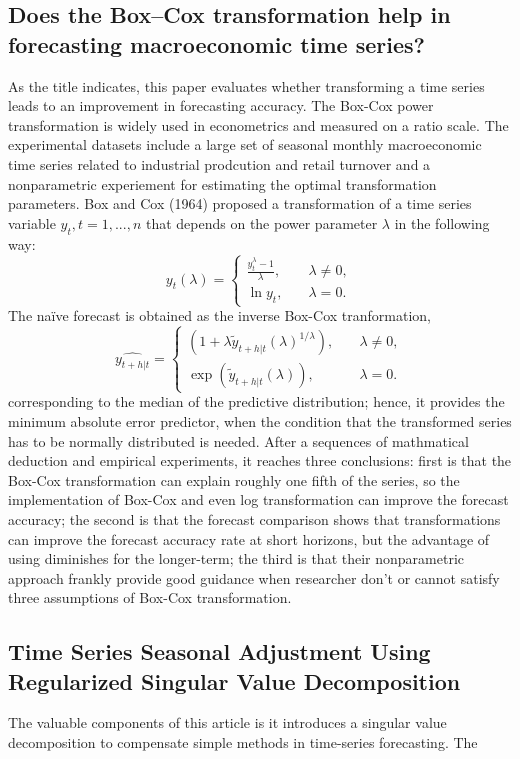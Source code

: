 \documentclass[12pt]{article}
\begin{document}
\subsection{Does the Box–Cox transformation help in forecasting macroeconomic time series? }
As the title indicates, this paper evaluates whether transforming a time series leads to an improvement in forecasting accuracy. The Box-Cox power transformation is widely used in econometrics and measured on a ratio scale. The experimental datasets include a large set of seasonal monthly macroeconomic time series related to industrial prodcution and retail turnover and a nonparametric experiement for estimating the optimal transformation parameters. Box and Cox (1964) proposed a transformation of a time series variable $y_t, t = 1, ..., n$ that depends on the power parameter $\lambda$ in the following way: 
$$
y_t(\lambda) = 
  \begin{cases}
    \frac{y_t^{\lambda} - 1}{\lambda}, &\quad \lambda \neq 0, \\ 
    \ln{y_t}, &\quad \lambda = 0. 
  \end{cases}
$$
The naïve forecast is obtained as the inverse Box-Cox tranformation, 
$$
\hat{y_{t+h|t}} = 
  \begin{cases}
    (1+\lambda \tilde{y}_{t+h|t}(\lambda)^{1/\lambda}), &\quad \lambda \neq 0, \\
    \exp(\tilde{y}_{t+h|t}(\lambda)), &\quad \lambda = 0. 
  \end{cases} 
$$
corresponding to the median of the predictive distribution; hence, it provides the minimum absolute error predictor, when the condition that the transformed series has to be normally distributed is needed. After a sequences of mathmatical deduction and empirical experiments, it reaches three conclusions: first is that the Box-Cox transformation can explain roughly one fifth of the series, so the implementation of Box-Cox and even log transformation can improve the forecast accuracy; the second is that the forecast comparison shows that transformations can improve the forecast accuracy rate at short horizons, but the advantage of using diminishes for the longer-term; the third is that their nonparametric approach frankly provide good guidance when researcher don't or cannot satisfy three assumptions of Box-Cox transformation. 

\subsection{Time Series Seasonal Adjustment Using Regularized Singular Value Decomposition}
The valuable components of this article is it introduces a singular value decomposition to compensate simple methods in time-series forecasting. The 
\end{document}
